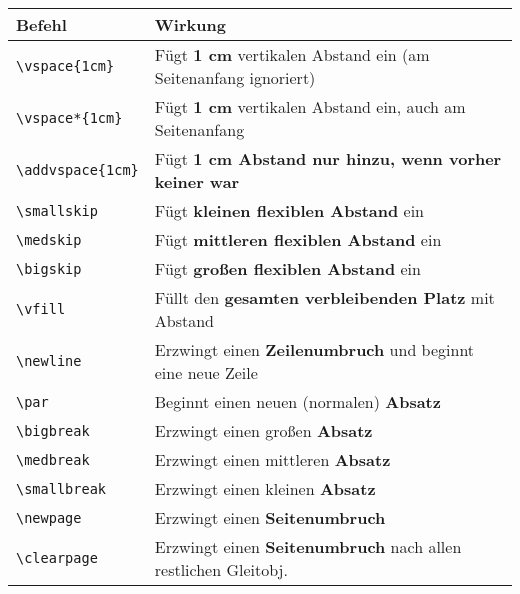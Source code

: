 \begin{table}[H]
    \centering
    \begin{tabular}{lp{10cm}}
        \toprule
        \textbf{Befehl}                           & \textbf{Wirkung}                                                      \\
        \midrule
        \texttt{\textbackslash vspace\{1cm\}}     & Fügt \textbf{1 cm} vertikalen Abstand ein (am Seitenanfang ignoriert) \\
        \texttt{\textbackslash vspace*\{1cm\}}    & Fügt \textbf{1 cm} vertikalen Abstand ein, auch am Seitenanfang       \\
        \texttt{\textbackslash addvspace\{1cm\}}  & Fügt \textbf{1 cm Abstand nur hinzu, wenn vorher keiner war}          \\
        \texttt{\textbackslash smallskip}         & Fügt \textbf{kleinen flexiblen Abstand} ein                           \\
        \texttt{\textbackslash medskip}           & Fügt \textbf{mittleren flexiblen Abstand} ein                         \\
        \texttt{\textbackslash bigskip}           & Fügt \textbf{großen flexiblen Abstand} ein                            \\
        \texttt{\textbackslash vfill}             & Füllt den \textbf{gesamten verbleibenden Platz} mit Abstand           \\
        \midrule
        \texttt{\textbackslash newline}           & Erzwingt einen \textbf{Zeilenumbruch} und beginnt eine neue Zeile     \\
        \texttt{\textbackslash par}               & Beginnt einen neuen (normalen) \textbf{Absatz}                        \\
        \texttt{\textbackslash bigbreak}          & Erzwingt einen großen \textbf{Absatz}                                 \\
        \texttt{\textbackslash medbreak}          & Erzwingt einen mittleren \textbf{Absatz}                              \\
        \texttt{\textbackslash smallbreak}        & Erzwingt einen kleinen \textbf{Absatz}                                \\
        \texttt{\textbackslash newpage}           & Erzwingt einen \textbf{Seitenumbruch}                                 \\
        \texttt{\textbackslash clearpage}         & Erzwingt einen \textbf{Seitenumbruch} nach allen restlichen Gleitobj. \\

\end{tabular}
\end{table}
